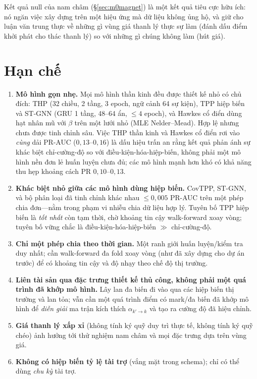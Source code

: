 \documentclass[11pt,a4paper]{article}
\begin{document}
Kết quả null của nam châm (\S\ref{sec:m0magnet}) là một kết quả tiêu cực hữu ích: nó ngăn việc xây dựng trên một hiệu ứng mà dữ liệu không ủng hộ, và giữ cho luận văn trung thực về những gì vùng giá thanh lý thực sự làm (đánh dấu điểm khởi phát cho thác thanh lý) so với những gì chúng không làm (hút giá).

\section{Hạn chế}

\begin{enumerate}[nosep]
    \item \textbf{Mô hình gọn nhẹ.} Mọi mô hình thần kinh đều được thiết kế nhỏ có chủ đích: THP (32 chiều, 2 tầng, 3 epoch, ngữ cảnh 64 sự kiện), TPP hiệp biến và ST-GNN (GRU 1 tầng, 48--64 ẩn, $\le 4$ epoch), và Hawkes cổ điển dùng hạt nhân mũ với $\beta$ trên một lưới nhỏ (MLE Nelder--Mead). Hợp lệ nhưng chưa được tinh chỉnh sâu. Việc THP thần kinh và Hawkes cổ điển rơi vào \emph{cùng} dải PR-AUC ($0{,}13$--$0{,}16$) là dấu hiệu trấn an rằng kết quả phản ánh sự khác biệt chỉ-cường-độ so với điều-kiện-hóa-hiệp-biến, không phải một mô hình nền đơn lẻ huấn luyện chưa đủ; các mô hình mạnh hơn khó có khả năng thu hẹp khoảng cách PR $0{,}10$--$0{,}13$.
    \item \textbf{Khác biệt nhỏ giữa các mô hình dùng hiệp biến.} CovTPP, ST-GNN, và bộ phân loại đã tinh chỉnh khác nhau $\le 0{,}005$ PR-AUC trên một phép chia đơn---nằm trong phạm vi nhiễu chia dữ liệu hợp lý. Tuyên bố TPP hiệp biến là \emph{tốt nhất} còn tạm thời, chờ khoảng tin cậy walk-forward xoay vòng; tuyên bố vững chắc là điều-kiện-hóa-hiệp-biến $\gg$ chỉ-cường-độ.
    \item \textbf{Chỉ một phép chia theo thời gian.} Một ranh giới huấn luyện/kiểm tra duy nhất; cần walk-forward đa fold xoay vòng (như đã xây dựng cho dự án trước) để có khoảng tin cậy và độ nhạy theo chế độ thị trường.
    \item \textbf{Liên tài sản qua đặc trưng thiết kế thủ công, không phải một quá trình đã khớp mô hình.} Lây lan đa biến đi vào qua các hiệp biến thị trường và lan tỏa; vẫn cần một quá trình điểm có mark/đa biến đã khớp mô hình để \emph{diễn giải} ma trận kích thích $\alpha_{k'\to k}$ và tạo ra cường độ đã hiệu chỉnh.
    \item \textbf{Giá thanh lý xấp xỉ} (không tính ký quỹ duy trì thực tế, không tính ký quỹ chéo) ảnh hưởng tới thử nghiệm nam châm và mọi đặc trưng dựa trên vùng giá.
    \item \textbf{Không có hiệp biến tỷ lệ tài trợ} (vắng mặt trong schema); chỉ có thể dùng \emph{chu kỳ} tài trợ.
\end{enumerate}
\end{document}
